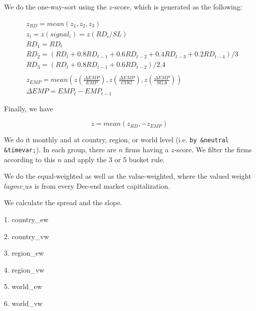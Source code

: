 





\thispagestyle{fancy}

\newcommand{\code}{\texttt}
\newcommand*{\Commonpath}{20181205/SL}
{}

We do the one-way-sort using the $z$-score, which is generated as the following:

$$
\begin{aligned}
& z_{RD} = mean(z_1, z_2, z_3) \\
& z_i = z(signal_i) = z(RD_i/SL) \\
& RD_1 = RD_t \\
& RD_2 = (RD_t + 0.8RD_{t-1} + 0.6RD_{t-2} + 0.4RD_{t-3} + 0.2RD_{t-4})/3 \\
& RD_3 = (RD_t + 0.8RD_{t-1} + 0.6RD_{t-2})/2.4 \\
& \\
& z_{EMP} = mean(z(\frac{\Delta EMP}{EMP}), z(\frac{\Delta EMP}{COG}), z(\frac{\Delta EMP}{SGA})) \\
& \Delta EMP = EMP_t - EMP_{t-1}
\end{aligned}
$$

Finally, we have

$$
z = mean(z_{RD}, -z_{EMP})
$$


We do it monthly and at country, region, or world level (i.e. \code{by \&neutral \&timevar;}). In each group, there are $n$ firms having a $z$-score. We filter the firms according to this $n$ and apply the 3 or 5 bucket rule.

We do the equal-weighted as well as the value-weighted, where the valued weight $lagmv\_us$ is from every Dec-end market capitalization.

We calculate the spread and the slope.

1. country\_ew


2. country\_vw


3. region\_ew


4. region\_vw


5. world\_ew


6. world\_vw



